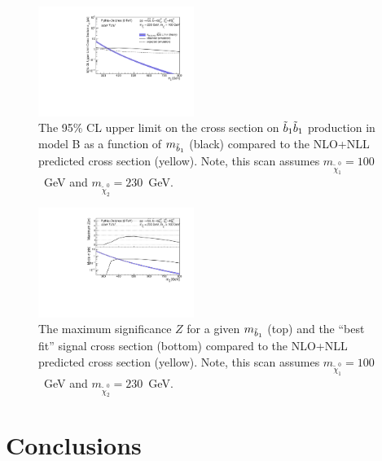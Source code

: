 \begin{figure}[htb]
\includegraphics[width=0.45\textwidth]{figs/pheno/xsecUL_T2bH_100_Total.pdf}
\caption{\label{fig:T2bH1dLimit} The 95\% CL upper limit on the
  cross section on $\tilde{b}_1\tilde{b}_1$ production in model B as a function of $m_{\tilde{b}_1}$ (black) compared
  to the NLO+NLL predicted cross section (yellow). Note, this scan assumes
  $m_{\tilde\chi_1^0}=100$~GeV and $m_{\tilde{\chi}_2^0}=230$~GeV.}
\end{figure}

\begin{figure}[htb]
\includegraphics[width=0.45\textwidth]{figs/pheno/signif_T2bH_100_Total.pdf}
\caption{\label{fig:T2bH1dSignif} The maximum significance $Z$ for a
  given $m_{\tilde{b}_1}$ (top) and the ``best fit'' signal cross
  section (bottom) compared to the NLO+NLL predicted cross section (yellow). Note, this scan assumes
  $m_{\tilde\chi_1^0}=100$~GeV and $m_{\tilde{\chi}_2^0}=230$~GeV.}
\end{figure}


\section{Conclusions}
\label{sec:conclusions}